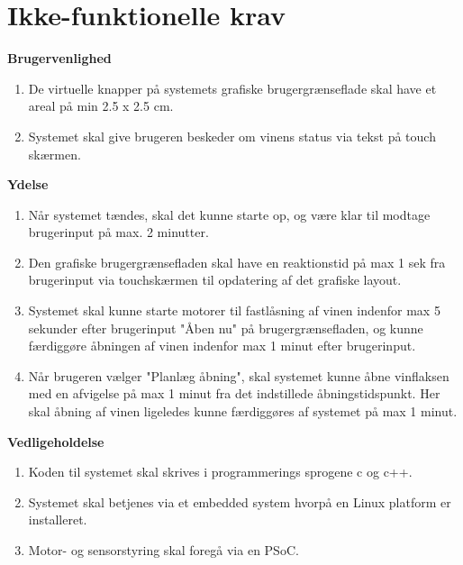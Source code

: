 \section{Ikke-funktionelle krav}

\bfseries{Brugervenlighed}
\begin{enumerate}
\item De virtuelle knapper på systemets grafiske brugergrænseflade skal have et areal på min 2.5 x 2.5 cm.
\item Systemet skal give brugeren beskeder om vinens status via tekst på touch skærmen.
\end{enumerate}

\bfseries{Ydelse}
\begin{enumerate}
\item Når systemet tændes, skal det kunne starte op, og være klar til modtage brugerinput på max. 2 minutter.
\item Den grafiske brugergrænsefladen skal have en reaktionstid på max 1 sek fra brugerinput via touchskærmen 
til opdatering af det grafiske layout.
\item Systemet skal kunne starte motorer til fastlåsning af vinen indenfor max 5 sekunder efter brugerinput "Åben nu" på brugergrænsefladen, og kunne færdiggøre åbningen af vinen indenfor max 1 minut efter brugerinput.
\item Når brugeren vælger "Planlæg åbning", skal systemet kunne åbne vinflaksen med en afvigelse på max 1 minut fra det indstillede åbningstidspunkt. Her skal åbning af vinen ligeledes kunne færdiggøres af systemet på max 1 minut.
\end{enumerate}

\bfseries{Vedligeholdelse}
\begin{enumerate}
\item Koden til systemet skal skrives i programmerings sprogene c og c++.
\item Systemet skal betjenes via et embedded system hvorpå en Linux platform er installeret.
\item Motor- og sensorstyring skal foregå via en PSoC.
\end{enumerate}
